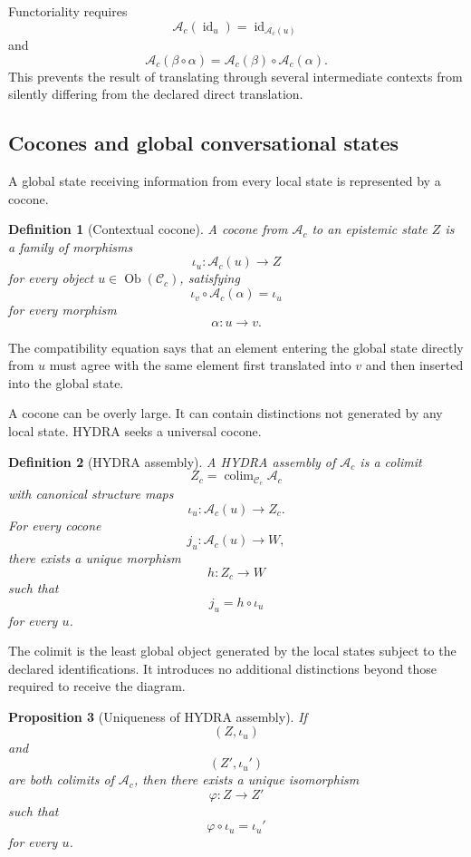 \documentclass[11pt]{article}
\newtheorem{definition}{Definition}[section]
\newtheorem{proposition}[definition]{Proposition}
\theoremstyle{definition}
\DeclareMathOperator{\colim}{colim}
\DeclareMathOperator{\Ob}{Ob}
\newcommand{\C}{\mathcal{C}}
\newcommand{\A}{\mathcal{A}}
\begin{document}
Functoriality requires
\[
\A_c(\operatorname{id}_u)
=
\operatorname{id}_{\A_c(u)}
\]
and
\[
\A_c(\beta\circ\alpha)
=
\A_c(\beta)\circ\A_c(\alpha).
\]
This prevents the result of translating through several intermediate contexts from silently differing from the declared direct translation.

\subsection{Cocones and global conversational states}

A global state receiving information from every local state is represented by a cocone.

\begin{definition}[Contextual cocone]
A cocone from \(\A_c\) to an epistemic state \(Z\) is a family of morphisms
\[
\iota_u:\A_c(u)\to Z
\]
for every object \(u\in\Ob(\C_c)\), satisfying
\[
\iota_v\circ\A_c(\alpha)
=
\iota_u
\]
for every morphism
\[
\alpha:u\to v.
\]
\end{definition}

The compatibility equation says that an element entering the global state directly from \(u\) must agree with the same element first translated into \(v\) and then inserted into the global state.

A cocone can be overly large. It can contain distinctions not generated by any local state. HYDRA seeks a universal cocone.

\begin{definition}[HYDRA assembly]
A HYDRA assembly of \(\A_c\) is a colimit
\[
Z_c
=
\colim_{\C_c}\A_c
\]
with canonical structure maps
\[
\iota_u:\A_c(u)\to Z_c.
\]
For every cocone
\[
j_u:\A_c(u)\to W,
\]
there exists a unique morphism
\[
h:Z_c\to W
\]
such that
\[
j_u=h\circ\iota_u
\]
for every \(u\).
\end{definition}

The colimit is the least global object generated by the local states subject to the declared identifications. It introduces no additional distinctions beyond those required to receive the diagram.

\begin{proposition}[Uniqueness of HYDRA assembly]
If
\[
(Z,\iota_u)
\]
and
\[
(Z',\iota_u')
\]
are both colimits of \(\A_c\), then there exists a unique isomorphism
\[
\varphi:Z\to Z'
\]
such that
\[
\varphi\circ\iota_u
=
\iota_u'
\]
for every \(u\).
\end{proposition}
\end{document}
